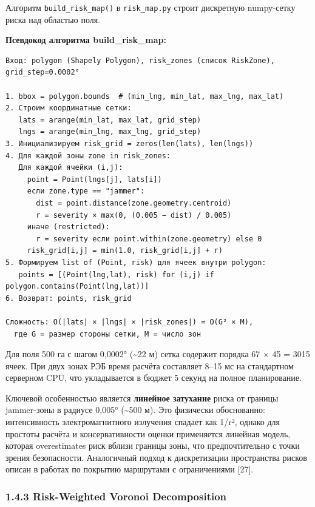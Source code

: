Алгоритм \texttt{build\_risk\_map()} в \texttt{risk\_map.py} строит дискретную numpy-сетку риска над областью поля.

\textbf{Псевдокод алгоритма build\_risk\_map:}

\begin{verbatim}
Вход: polygon (Shapely Polygon), risk_zones (список RiskZone), grid_step=0.0002°

1. bbox = polygon.bounds  # (min_lng, min_lat, max_lng, max_lat)
2. Строим координатные сетки:
   lats = arange(min_lat, max_lat, grid_step)
   lngs = arange(min_lng, max_lng, grid_step)
3. Инициализируем risk_grid = zeros(len(lats), len(lngs))
4. Для каждой зоны zone in risk_zones:
   Для каждой ячейки (i,j):
     point = Point(lngs[j], lats[i])
     если zone.type == "jammer":
       dist = point.distance(zone.geometry.centroid)
       r = severity × max(0, (0.005 − dist) / 0.005)
     иначе (restricted):
       r = severity если point.within(zone.geometry) else 0
     risk_grid[i,j] = min(1.0, risk_grid[i,j] + r)
5. Формируем list of (Point, risk) для ячеек внутри polygon:
   points = [(Point(lng,lat), risk) for (i,j) if polygon.contains(Point(lng,lat))]
6. Возврат: points, risk_grid

Сложность: O(|lats| × |lngs| × |risk_zones|) = O(G² × M),
  где G = размер стороны сетки, M = число зон
\end{verbatim}

Для поля 500 га с шагом 0,0002° (\textasciitilde22 м) сетка содержит порядка 67 × 45 = 3015 ячеек. При двух зонах РЭБ время расчёта составляет 8--15 мс на стандартном серверном CPU, что укладывается в бюджет 5 секунд на полное планирование.

Ключевой особенностью является \textbf{линейное затухание} риска от границы jammer-зоны в радиусе 0,005° (\textasciitilde500 м). Это физически обоснованно: интенсивность электромагнитного излучения спадает как 1/r², однако для простоты расчёта и консервативности оценки применяется линейная модель, которая overestimates риск вблизи границы зоны, что предпочтительно с точки зрения безопасности. Аналогичный подход к дискретизации пространства рисков описан в работах по покрытию маршрутами с ограничениями {[}27{]}.

\hypertarget{risk-weighted-voronoi-decomposition}{%
\subsubsection{1.4.3 Risk-Weighted Voronoi Decomposition}\label{risk-weighted-voronoi-decomposition}}

